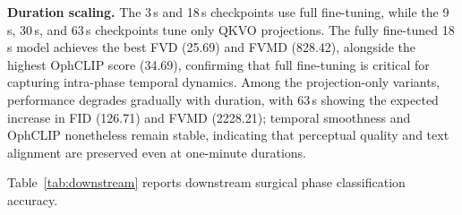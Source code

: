 \documentclass[runningheads]{llncs}
\begin{document}
\noindent\textbf{Duration scaling.} The 3\,s and 18\,s checkpoints use full fine-tuning, while the 9\,s, 30\,s, and 63\,s checkpoints tune only QKVO projections. The fully fine-tuned 18\,s model achieves the best FVD (25.69) and FVMD (828.42), alongside the highest OphCLIP score (34.69), confirming that full fine-tuning is critical for capturing intra-phase temporal dynamics. Among the projection-only variants, performance degrades gradually with duration, with 63\,s showing the expected increase in FID (126.71) and FVMD (2228.21); temporal smoothness and OphCLIP nonetheless remain stable, indicating that perceptual quality and text alignment are preserved even at one-minute durations.

Table~\ref{tab:downstream} reports downstream surgical phase classification accuracy.

\begin{table}[t]
\centering
\caption{Quantitative results for text-conditioned surgical video synthesis. \textit{Top:} Comparison against the Ophora baseline on 3-second clips at 16 fps. \textit{Bottom:} Generation quality of \textsc{CatStory} across extended temporal lengths. VB-Smooth: VBench Temporal Smoothness; VB-Consist: VBench Temporal Consistency; OphCLIP: domain-adapted CLIP score ($w{=}100$).}
\label{tab:combined_metrics}
\setlength{\tabcolsep}{8pt}
\renewcommand{\arraystretch}{1.15}
\end{table}
\end{document}
